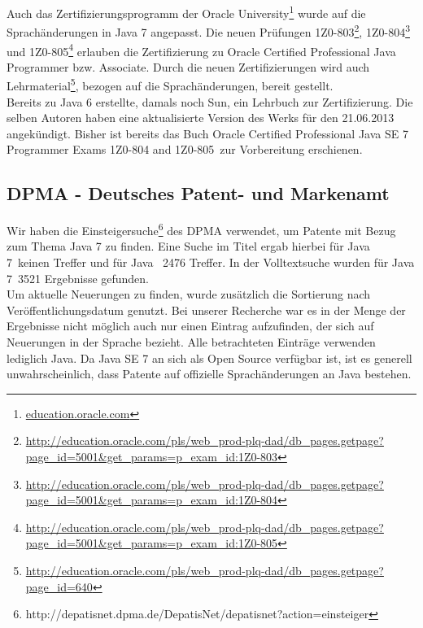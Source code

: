 Auch das Zertifizierungsprogramm der Oracle University\footnote{\url{education.oracle.com}} wurde auf die Sprachänderungen in Java 7 angepasst.
Die neuen Prüfungen 1Z0-803\footnote{\url{http://education.oracle.com/pls/web_prod-plq-dad/db_pages.getpage?page_id=5001&get_params=p_exam_id:1Z0-803}}, 
1Z0-804\footnote{\url{http://education.oracle.com/pls/web_prod-plq-dad/db_pages.getpage?page_id=5001&get_params=p_exam_id:1Z0-804}} und 
1Z0-805\footnote{\url{http://education.oracle.com/pls/web_prod-plq-dad/db_pages.getpage?page_id=5001&get_params=p_exam_id:1Z0-805}} 
erlauben die Zertifizierung zu Oracle Certified Professional Java Programmer bzw. Associate.
Durch die neuen Zertifizierungen wird auch Lehrmaterial\footnote{\url{http://education.oracle.com/pls/web_prod-plq-dad/db_pages.getpage?page_id=640}}, 
bezogen auf die Sprachänderungen, bereit gestellt.\\

Bereits zu Java 6 erstellte, damals noch Sun, ein Lehrbuch\cite{scjp6} zur Zertifizierung. Die selben Autoren haben eine aktualisierte 
Version des Werks\cite{scjp7} für den 21.06.2013 angekündigt. Bisher ist bereits das Buch 
\glqq Oracle Certified Professional Java SE 7 Programmer Exams 1Z0-804 and 1Z0-805\grqq\cite{apressjava}~zur Vorbereitung erschienen.

\subsection*{DPMA - Deutsches Patent- und Markenamt}

Wir haben die Einsteigersuche\footnote{http://depatisnet.dpma.de/DepatisNet/depatisnet?action=einsteiger} des DPMA verwendet, um Patente mit Bezug zum Thema Java 7 zu finden. Eine Suche im Titel ergab hierbei für \glqq Java 7\grqq ~keinen Treffer und für \glqq Java \grqq ~2476 Treffer. In der Volltextsuche wurden für \glqq Java 7\grqq ~3521 Ergebnisse gefunden.\\

Um aktuelle Neuerungen zu finden, wurde zusätzlich die Sortierung nach Veröffentlichungsdatum genutzt. Bei unserer Recherche war es in der Menge der Ergebnisse nicht möglich auch nur einen Eintrag aufzufinden, der sich auf Neuerungen in der Sprache bezieht. Alle betrachteten Einträge verwenden lediglich Java. Da Java SE 7 an sich als Open Source verfügbar ist, ist es generell unwahrscheinlich, dass Patente auf offizielle Sprachänderungen an Java bestehen.\\

